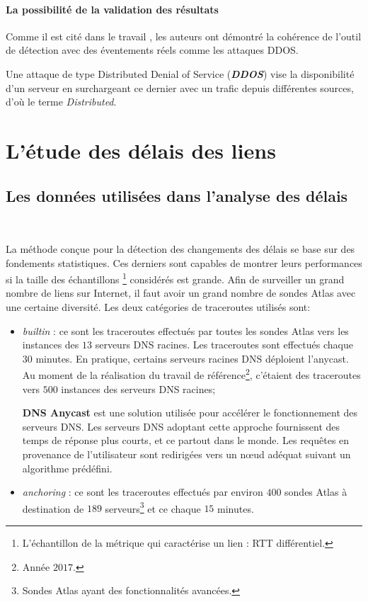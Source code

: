 \paragraph{La possibilité de la validation des résultats}  Comme il est cité dans le travail \cite{DBLP:journals/corr/FontugneAPB16}, les auteurs ont démontré la cohérence de l'outil de détection avec des éventements réels comme les  attaques DDOS.
	
	\begin{tcolorbox}
		Une attaque de type Distributed Denial of Service (\textbf{\textit{DDOS}}) vise la disponibilité d'un serveur en surchargeant ce dernier avec un trafic depuis différentes sources, d'où le terme \textit{Distributed}.
	\end{tcolorbox}
	

\section{L'étude des délais des liens } 

\subsection{Les données utilisées dans l'analyse des délais}~

La méthode conçue pour la détection des changements des délais se base sur des fondements statistiques. Ces derniers sont capables de montrer leurs performances si la taille des échantillons \footnote{L'échantillon de la métrique qui caractérise un lien : RTT différentiel.} considérés est grande.   Afin de surveiller un grand nombre de liens sur Internet, il faut avoir un grand nombre de sondes Atlas avec une certaine diversité.  Les   deux catégories de traceroutes  utilisés sont:


\begin{itemize}
	\item \textit{builtin} : ce sont les traceroutes effectués par toutes les sondes Atlas vers les instances des  $13$ serveurs DNS racines. Les traceroutes sont effectués chaque $30$ minutes. En pratique, certains serveurs racines DNS déploient l'anycast. Au moment de la réalisation du travail de référence\footnote{Année $2017$.}, c'étaient des traceroutes vers $ 500 $ instances des serveurs DNS racines;
	\begin{tcolorbox}
		\textbf{DNS Anycast} est une solution   utilisée pour accélérer le fonctionnement  des serveurs DNS. Les serveurs DNS adoptant cette approche fournissent des temps de réponse plus courts, et ce partout dans le monde. Les requêtes en provenance de l'utilisateur sont redirigées vers un n\oe{}ud adéquat suivant un algorithme prédéfini. 
	\end{tcolorbox}
	
	\item \textit{anchoring} : ce sont les traceroutes effectués par environ $400$ sondes Atlas à destination de $189$ serveurs\footnote{Sondes Atlas ayant des fonctionnalités avancées.} et ce chaque $15$ minutes.
\end{itemize}

